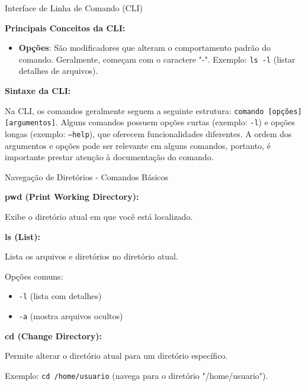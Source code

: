 \documentclass{beamer}
\begin{document}
\begin{frame}{Interface de Linha de Comando (CLI)}

	\textbf{Principais Conceitos da CLI:}

	\begin{itemize}
		\item \textbf{Opções}: São modificadores que alteram o comportamento padrão do comando. Geralmente, começam com o caractere "-". Exemplo: \texttt{ls -l} (listar detalhes de arquivos).
	\end{itemize}

	\textbf{Sintaxe da CLI:}

	Na CLI, os comandos geralmente seguem a seguinte estrutura: \texttt{comando [opções] [argumentos]}.
	Alguns comandos possuem opções curtas (exemplo: \texttt{-l}) e opções longas (exemplo: \texttt{--help}), que oferecem funcionalidades diferentes.
	A ordem dos argumentos e opções pode ser relevante em alguns comandos, portanto, é importante prestar atenção à documentação do comando.

\end{frame}
\begin{frame}{Navegação de Diretórios - Comandos Básicos}

	\textbf{pwd (Print Working Directory):}

	Exibe o diretório atual em que você está localizado.

	\textbf{ls (List):}

	Lista os arquivos e diretórios no diretório atual.

	Opções comuns:
	\begin{itemize}
		\item \texttt{-l} (lista com detalhes)
		\item \texttt{-a} (mostra arquivos ocultos)
	\end{itemize}

	\textbf{cd (Change Directory):}

	Permite alterar o diretório atual para um diretório específico.

	Exemplo: \texttt{cd /home/usuario} (navega para o diretório "/home/usuario").

\end{frame}
\end{document}
